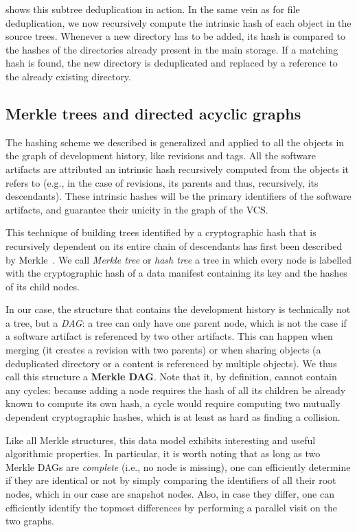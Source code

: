  shows this subtree deduplication in action. In
the same vein as for file deduplication, we now recursively compute the
intrinsic hash of each object in the source trees. Whenever a new directory has
to be added, its hash is compared to the hashes of the directories already
present in the main storage. If a matching hash is found, the new directory is
deduplicated and replaced by a reference to the already existing directory.

\subsection{Merkle trees and directed acyclic graphs}

The hashing scheme we described is generalized and applied to all the objects
in the graph of development history, like revisions and tags. All the software
artifacts are attributed an intrinsic hash recursively computed from the
objects it refers to (e.g., in the case of revisions, its parents and thus,
recursively, its descendants). These intrinsic hashes will be the primary
identifiers of the software artifacts, and guarantee their unicity in the graph
of the \gls{VCS}.

This technique of building trees identified by a cryptographic hash that is
recursively dependent on its entire chain of descendants has first been
described by Merkle~\cite{Merkle}. We call \emph{Merkle tree} or \emph{hash
tree} a tree in which every node is labelled with the cryptographic hash of a
data manifest containing its key and the hashes of its child nodes.

In our case, the structure that contains the development history is technically
not a tree, but a \emph{\gls{DAG}}: a tree can only have one parent node, which
is not the case if a software artifact is referenced by two other artifacts.
This can happen when merging (it creates a revision with two parents) or when
sharing objects (a deduplicated directory or a content is referenced by
multiple objects). We thus call this structure a \textbf{Merkle DAG}. Note that
it, by definition, cannot contain any cycles: because adding a node requires
the hash of all its children be already known to compute its own hash, a cycle
would require computing two mutually dependent cryptographic hashes, which is
at least as hard as finding a collision.

Like all Merkle structures, this data model exhibits interesting and useful
algorithmic properties. In particular, it is worth noting that as long as two
Merkle DAGs are \emph{complete} (i.e., no node is missing), one can efficiently
determine if they are identical or not by simply comparing the identifiers of
all their root nodes, which in our case are snapshot nodes. Also, in case they
differ, one can efficiently identify the topmost differences by performing a
parallel visit on the two graphs.

